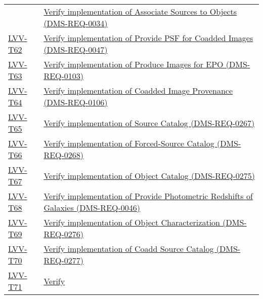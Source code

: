 \begin{longtable}[]{p{3cm}p{13cm}}
&
\href{https://jira.lsstcorp.org/secure/Tests.jspa\#/testCase/LVV-T61}{Verify
implementation of Associate Sources to Objects
(DMS-REQ-0034)}\tabularnewline
\protect\hyperlink{lvv-t62---verify-implementation-of-provide-psf-for-coadded-images-dms-req-0047}{LVV-T62}
&
\href{https://jira.lsstcorp.org/secure/Tests.jspa\#/testCase/LVV-T62}{Verify
implementation of Provide PSF for Coadded Images
(DMS-REQ-0047)}\tabularnewline
\protect\hyperlink{lvv-t63---verify-implementation-of-produce-images-for-epo-dms-req-0103}{LVV-T63}
&
\href{https://jira.lsstcorp.org/secure/Tests.jspa\#/testCase/LVV-T63}{Verify
implementation of Produce Images for EPO (DMS-REQ-0103)}\tabularnewline
\protect\hyperlink{lvv-t64---verify-implementation-of-coadded-image-provenance-dms-req-0106}{LVV-T64}
&
\href{https://jira.lsstcorp.org/secure/Tests.jspa\#/testCase/LVV-T64}{Verify
implementation of Coadded Image Provenance
(DMS-REQ-0106)}\tabularnewline
\protect\hyperlink{lvv-t65---verify-implementation-of-source-catalog-dms-req-0267}{LVV-T65}
&
\href{https://jira.lsstcorp.org/secure/Tests.jspa\#/testCase/LVV-T65}{Verify
implementation of Source Catalog (DMS-REQ-0267)}\tabularnewline
\protect\hyperlink{lvv-t66---verify-implementation-of-forced-source-catalog-dms-req-0268}{LVV-T66}
&
\href{https://jira.lsstcorp.org/secure/Tests.jspa\#/testCase/LVV-T66}{Verify
implementation of Forced-Source Catalog (DMS-REQ-0268)}\tabularnewline
\protect\hyperlink{lvv-t67---verify-implementation-of-object-catalog-dms-req-0275}{LVV-T67}
&
\href{https://jira.lsstcorp.org/secure/Tests.jspa\#/testCase/LVV-T67}{Verify
implementation of Object Catalog (DMS-REQ-0275)}\tabularnewline
\protect\hyperlink{lvv-t68---verify-implementation-of-provide-photometric-redshifts-of-galaxies-dms-req-0046}{LVV-T68}
&
\href{https://jira.lsstcorp.org/secure/Tests.jspa\#/testCase/LVV-T68}{Verify
implementation of Provide Photometric Redshifts of Galaxies
(DMS-REQ-0046)}\tabularnewline
\protect\hyperlink{lvv-t69---verify-implementation-of-object-characterization-dms-req-0276}{LVV-T69}
&
\href{https://jira.lsstcorp.org/secure/Tests.jspa\#/testCase/LVV-T69}{Verify
implementation of Object Characterization (DMS-REQ-0276)}\tabularnewline
\protect\hyperlink{lvv-t70---verify-implementation-of-coadd-source-catalog-dms-req-0277}{LVV-T70}
&
\href{https://jira.lsstcorp.org/secure/Tests.jspa\#/testCase/LVV-T70}{Verify
implementation of Coadd Source Catalog (DMS-REQ-0277)}\tabularnewline
\protect\hyperlink{lvv-t71---verify-implementation-of-detecting-extended--low-surface-brightness-objects-dms-req-0349}{LVV-T71}
&
\href{https://jira.lsstcorp.org/secure/Tests.jspa\#/testCase/LVV-T71}{Verify
}
\end{longtable}
